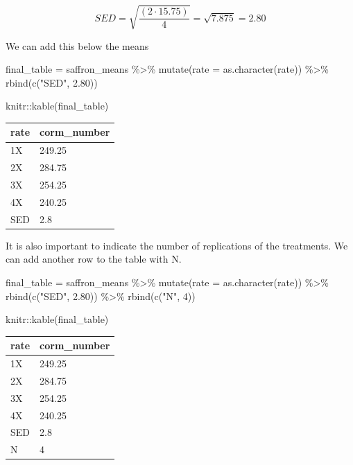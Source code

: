 \documentclass[
]{book}
\newenvironment{Shaded}{\begin{snugshade}}{\end{snugshade}}
\newcommand{\AttributeTok}[1]{\textcolor[rgb]{0.77,0.63,0.00}{#1}}
\newcommand{\DecValTok}[1]{\textcolor[rgb]{0.00,0.00,0.81}{#1}}
\newcommand{\FloatTok}[1]{\textcolor[rgb]{0.00,0.00,0.81}{#1}}
\newcommand{\FunctionTok}[1]{\textcolor[rgb]{0.00,0.00,0.00}{#1}}
\newcommand{\NormalTok}[1]{#1}
\newcommand{\OtherTok}[1]{\textcolor[rgb]{0.56,0.35,0.01}{#1}}
\newcommand{\SpecialCharTok}[1]{\textcolor[rgb]{0.00,0.00,0.00}{#1}}
\newcommand{\StringTok}[1]{\textcolor[rgb]{0.31,0.60,0.02}{#1}}
\begin{document}
\[ SED = \sqrt{\frac{(2 \cdot 15.75)}{4}} = \sqrt{7.875} = 2.80 \]

We can add this below the means

\begin{Shaded}
\begin{Highlighting}[]
\NormalTok{final\_table }\OtherTok{=}\NormalTok{ saffron\_means }\SpecialCharTok{\%\textgreater{}\%}
  \FunctionTok{mutate}\NormalTok{(}\AttributeTok{rate =} \FunctionTok{as.character}\NormalTok{(rate)) }\SpecialCharTok{\%\textgreater{}\%}
  \FunctionTok{rbind}\NormalTok{(}\FunctionTok{c}\NormalTok{(}\StringTok{"SED"}\NormalTok{, }\FloatTok{2.80}\NormalTok{))}

\NormalTok{knitr}\SpecialCharTok{::}\FunctionTok{kable}\NormalTok{(final\_table)}
\end{Highlighting}
\end{Shaded}

\begin{tabular}{l|l}
\hline
rate & corm\_number\\
\hline
1X & 249.25\\
\hline
2X & 284.75\\
\hline
3X & 254.25\\
\hline
4X & 240.25\\
\hline
SED & 2.8\\
\hline
\end{tabular}

It is also important to indicate the number of replications of the treatments. We can add another row to the table with N.

\begin{Shaded}
\begin{Highlighting}[]
\NormalTok{final\_table }\OtherTok{=}\NormalTok{ saffron\_means }\SpecialCharTok{\%\textgreater{}\%}
  \FunctionTok{mutate}\NormalTok{(}\AttributeTok{rate =} \FunctionTok{as.character}\NormalTok{(rate)) }\SpecialCharTok{\%\textgreater{}\%}
  \FunctionTok{rbind}\NormalTok{(}\FunctionTok{c}\NormalTok{(}\StringTok{"SED"}\NormalTok{, }\FloatTok{2.80}\NormalTok{)) }\SpecialCharTok{\%\textgreater{}\%}
  \FunctionTok{rbind}\NormalTok{(}\FunctionTok{c}\NormalTok{(}\StringTok{"N"}\NormalTok{, }\DecValTok{4}\NormalTok{))}

\NormalTok{knitr}\SpecialCharTok{::}\FunctionTok{kable}\NormalTok{(final\_table)}
\end{Highlighting}
\end{Shaded}

\begin{tabular}{l|l}
\hline
rate & corm\_number\\
\hline
1X & 249.25\\
\hline
2X & 284.75\\
\hline
3X & 254.25\\
\hline
4X & 240.25\\
\hline
SED & 2.8\\
\hline
N & 4\\
\hline
\end{tabular}
\end{document}
